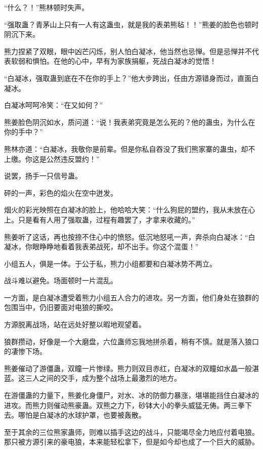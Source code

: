 
\begin{this_body}



“什么？！”熊林顿时失声。

“强取蛊？青茅山上只有一人有这蛊虫，就是我的表弟熊毡！！”熊姜的脸色也顿时阴沉下来。

熊力捏紧了双眼，眼中凶芒闪烁，别人怕白凝冰，他当然也忌惮。但是忌惮并不代表软弱和惧怕。在他的心中，早有为家族捐躯，死战白凝冰的觉悟！

“白凝冰，强取蛊到底在不在你的手上？”他大步跨出，任由方源错身而过，直面白凝冰。

白凝冰呵呵冷笑：“在又如何？”

熊姜脸色阴沉如水，质问道：“说！我表弟究竟是怎么死的？他的蛊虫，为什么在你的手中？”

熊林亦道：“白凝冰，我敬你是前辈。但是你私自吞没了我们熊家寨的蛊虫，却不上缴。你这是公然违反盟约！”

说罢，扬手一只信号蛊。

砰的一声，彩色的焰火在空中迸发。

烟火的彩光映照在白凝冰的脸上，他哈哈大笑：“什么狗屁的盟约，我从未放在心上。只是看有人用了强取蛊，过程有趣罢了，才拿来收藏的。”

熊姜听了这话，再也按捺不住心中的愤怒。低沉地怒吼一声，奔杀向白凝冰：“白凝冰，你眼睁睁地看着我表弟战死，却不出手。你这个混蛋！”

小组五人，俱是一体。于公于私，熊力小组都要和白凝冰势不两立。

战斗难以避免。场面顿时一片混乱。

一方面，是白凝冰遭受着熊力小组五人合力的进攻。另一方面，他们身处在狼群的包围当中，仍旧要面对电狼的撕咬。

方源脱离战场，站在远处好整以暇地观望着。

狼群攒动，好像是一个大磨盘，六位蛊师忘我地拼杀着，稍有不慎。就是落入狼口的凄惨下场。

熊姜催动了游僵蛊，双瞳一片惨绿。熊力则双目赤红，白凝冰的双瞳如水晶一般湛蓝。这三人之间的交手，成为整个战场上最激烈的地方。

在游僵蛊的力量下，熊姜化身僵尸，对水、冰的防御力暴涨，堪堪能挡住白凝冰的进攻。而熊力则催动熊豪蛊。双熊之力下，砂钵大小的拳头威猛无俦。两三拳下去。哪怕是白凝冰的水球护罩，也要被轰散。

至于其余的三位熊家蛊师，则难以插手这边的战斗，只能竭尽全力地应付着电狼。那只被方源引来的豪电狼，本来能轻松拿下，但是如今却也成了一个巨大的威胁。


\end{this_body}
